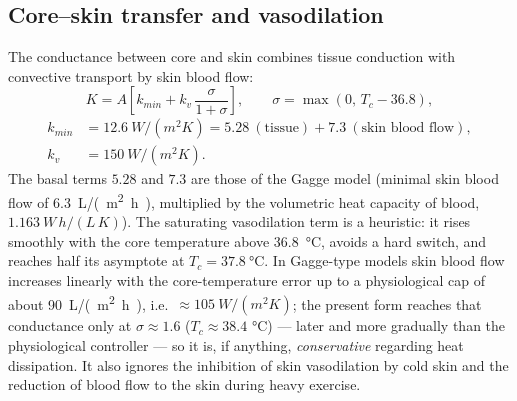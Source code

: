 \documentclass[11pt,a4paper]{article}
\begin{document}
\subsection{Core--skin transfer and vasodilation}
The conductance between core and skin combines tissue conduction with convective transport by skin blood flow:
\begin{equation}
 K = A\left[k_{min}+k_v\,\frac{\sigma}{1+\sigma}\right],\qquad \sigma=\max(0,\,T_c-36.8),
 \label{eq:K}
\end{equation}
\begin{align}
 k_{min}&=\SI{12.6}{W/(m^2K)}=5.28\ (\text{tissue})+7.3\ (\text{skin blood flow}),\\
 k_v&=\SI{150}{W/(m^2K)}.
\end{align}
The basal terms \(5.28\) and \(7.3\) are those of the Gagge model \citep{gagge1971,gagge1977} (minimal skin blood flow of \SI{6.3}{L/(m^2h)}, multiplied by the volumetric heat capacity of blood, \(\SI{1.163}{W\,h/(L\,K)}\)). The saturating vasodilation term is a heuristic: it rises smoothly with the core temperature above \SI{36.8}{\degreeCelsius}, avoids a hard switch, and reaches half its asymptote at \(T_c=37.8\ \si{\degreeCelsius}\). In Gagge-type models skin blood flow increases linearly with the core-temperature error up to a physiological cap of about \SI{90}{L/(m^2h)}, i.e.\ \(\approx\SI{105}{W/(m^2K)}\); the present form reaches that conductance only at \(\sigma\approx1.6\) (\(T_c\approx38.4\) \si{\degreeCelsius}) --- later and more gradually than the physiological controller --- so it is, if anything, \emph{conservative} regarding heat dissipation. It also ignores the inhibition of skin vasodilation by cold skin and the reduction of blood flow to the skin during heavy exercise.
\end{document}
